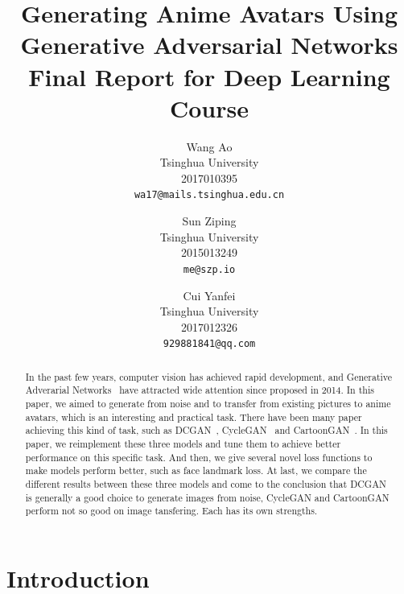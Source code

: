 \documentclass[10pt,twocolumn,letterpaper]{article}
\begin{document}
\title{Generating Anime Avatars Using Generative Adversarial Networks \\
\large Final Report for Deep Learning Course}

\author{Wang Ao\\
Tsinghua University\\
2017010395\\
{\tt\small wa17@mails.tsinghua.edu.cn}
\and
Sun Ziping\\
Tsinghua University\\
2015013249\\
{\tt\small me@szp.io}
\and
Cui Yanfei\\
Tsinghua University\\
2017012326\\
{\tt\small 929881841@qq.com}
}

\maketitle

\begin{abstract}
In the past few years, computer vision has achieved rapid development, and
Generative Adverarial Networks~\cite{GAN} have attracted wide attention since
proposed in 2014. In this paper, we aimed to generate from noise and to transfer
from existing pictures to anime avatars, which is an interesting and practical
task. There have been many paper achieving this kind of task, such as
DCGAN~\cite{DCGAN}, CycleGAN~\cite{CycleGAN2017} and
CartoonGAN~\cite{CartoonGAN}. In this paper, we reimplement these three models
and tune them to achieve better performance on this specific task. And then, we
give several novel loss functions to make models perform better, such as face
landmark loss. At last, we compare the different results between these three
models and come to the conclusion that DCGAN is generally a good choice to
generate images from noise, CycleGAN and CartoonGAN perform not so good on image
tansfering. Each has its own strengths.
\end{abstract}

\section{Introduction}
\end{document}
